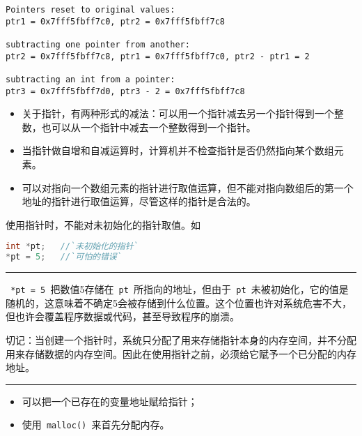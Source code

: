 \begin{frame}[fragile]\ft{\secname}
\begin{lstlisting}[backgroundcolor=\color{red!20}]
Pointers reset to original values:
ptr1 = 0x7fff5fbff7c0, ptr2 = 0x7fff5fbff7c8

subtracting one pointer from another:
ptr2 = 0x7fff5fbff7c8, ptr1 = 0x7fff5fbff7c0, ptr2 - ptr1 = 2

subtracting an int from a pointer:
ptr3 = 0x7fff5fbff7d0, ptr3 - 2 = 0x7fff5fbff7c8
\end{lstlisting}
\end{frame}

\begin{frame}[fragile]
\begin{itemize}
\item 关于指针，有两种形式的减法：可以用一个指针减去另一个指针得到一个整数，也可以从一个指针中减去一个整数得到一个指针。\\[0.1in]
\item 当指针做自增和自减运算时，计算机并不检查指针是否仍然指向某个数组元素。\\[0.1in]
\item 可以对指向一个数组元素的指针进行取值运算，但不能对指向数组后的第一个地址的指针进行取值运算，尽管这样的指针是合法的。
\end{itemize}
\end{frame}

\begin{frame}[fragile]
使用指针时，不能对未初始化的指针取值。如
\begin{lstlisting}[language=c,backgroundcolor=\color{red!20}]
int *pt;   //`未初始化的指针`
*pt = 5;   //`可怕的错误`
\end{lstlisting}
\rule{\textwidth}{0.3mm} \vspace{0.05in}\pause 

\lstinline| *pt = 5 |把数值5存储在\lstinline| pt |所指向的地址，但由于\lstinline| pt |未被初始化，它的值是随机的，这意味着不确定5会被存储到什么位置。这个位置也许对系统危害不大，但也许会覆盖程序数据或代码，甚至导致程序的崩溃。
\end{frame}

\begin{frame}[fragile]
切记：当创建一个指针时，系统只分配了用来存储指针本身的内存空间，并不分配用来存储数据的内存空间。因此在使用指针之前，必须给它赋予一个已分配的内存地址。

\rule{\textwidth}{0.3mm} \pause 

\begin{itemize}
\item 可以把一个已存在的变量地址赋给指针；
\item 使用\lstinline| malloc() |来首先分配内存。
\end{itemize}
\end{frame}

